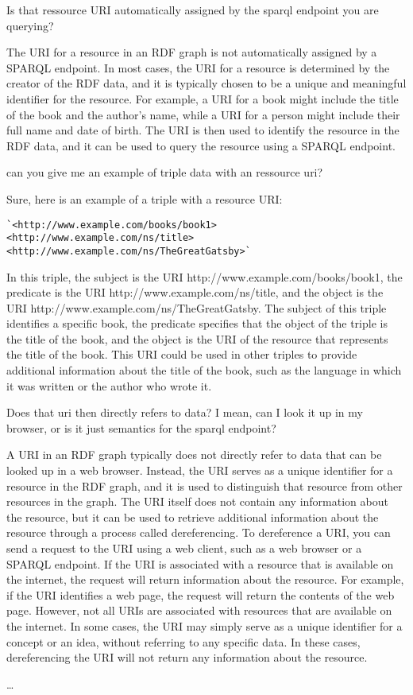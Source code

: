 \begin{description}
	\me Is that ressource URI automatically assigned by the sparql endpoint you are querying?

	\gpt The URI for a resource in an RDF graph is not automatically assigned by a SPARQL endpoint. In most cases, the URI for a resource is determined by the creator of the RDF data, and it is typically chosen to be a unique and meaningful identifier for the resource. For example, a URI for a book might include the title of the book and the author's name, while a URI for a person might include their full name and date of birth. The URI is then used to identify the resource in the RDF data, and it can be used to query the resource using a SPARQL endpoint.

	\me can you give me an example of triple data with an ressource uri?

	\gpt Sure, here is an example of a triple with a resource URI:

	\begin{lstlisting}[language=SPARQL]
`<http://www.example.com/books/book1> <http://www.example.com/ns/title> <http://www.example.com/ns/TheGreatGatsby>`	
\end{lstlisting}

	In this triple, the subject is the URI http://www.example.com/books/book1, the predicate is the URI http://www.example.com/ns/title, and the object is the URI http://www.example.com/ns/TheGreatGatsby.
	The subject of this triple identifies a specific book, the predicate specifies that the object of the triple is the title of the book, and the object is the URI of the resource that represents the title of the book. This URI could be used in other triples to provide additional information about the title of the book, such as the language in which it was written or the author who wrote it.

	\me Does that uri then directly refers to data? I mean, can I look it up in my browser, or is it just semantics for the sparql endpoint?

	\gpt A URI in an RDF graph typically does not directly refer to data that can be looked up in a web browser. Instead, the URI serves as a unique identifier for a resource in the RDF graph, and it is used to distinguish that resource from other resources in the graph. The URI itself does not contain any information about the resource, but it can be used to retrieve additional information about the resource through a process called dereferencing.
	To dereference a URI, you can send a request to the URI using a web client, such as a web browser or a SPARQL endpoint. If the URI is associated with a resource that is available on the internet, the request will return information about the resource. For example, if the URI identifies a web page, the request will return the contents of the web page.
	However, not all URIs are associated with resources that are available on the internet. In some cases, the URI may simply serve as a unique identifier for a concept or an idea, without referring to any specific data. In these cases, dereferencing the URI will not return any information about the resource.

	\dots
\end{description}
